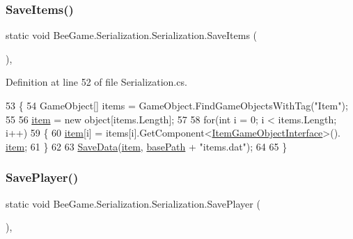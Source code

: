 \subsubsection{\texorpdfstring{Save\+Items()}{SaveItems()}}
{\footnotesize\ttfamily static void Bee\+Game.\+Serialization.\+Serialization.\+Save\+Items (\begin{DoxyParamCaption}{ }\end{DoxyParamCaption})\hspace{0.3cm}{\ttfamily [static]}, {\ttfamily [private]}}



Definition at line 52 of file Serialization.\+cs.


\begin{DoxyCode}
53         \{
54             GameObject[] items = GameObject.FindGameObjectsWithTag(\textcolor{stringliteral}{"Item"});
55 
56             \hyperlink{class_bee_game_1_1_serialization_1_1_serialization_af3359d6ca7e84c9e52a790beb1cc502e}{item} = \textcolor{keyword}{new} \textcolor{keywordtype}{object}[items.Length];
57 
58             \textcolor{keywordflow}{for}(\textcolor{keywordtype}{int} i = 0; i < items.Length; i++)
59             \{
60                 \hyperlink{class_bee_game_1_1_serialization_1_1_serialization_af3359d6ca7e84c9e52a790beb1cc502e}{item}[i] = items[i].GetComponent<\hyperlink{class_bee_game_1_1_items_1_1_item_game_object_interface}{ItemGameObjectInterface}>().
      \hyperlink{class_bee_game_1_1_serialization_1_1_serialization_af3359d6ca7e84c9e52a790beb1cc502e}{item};
61             \}
62 
63             \hyperlink{class_bee_game_1_1_serialization_1_1_serialization_a5e84293340234b478d4ef6bd8168260f}{SaveData}(\hyperlink{class_bee_game_1_1_serialization_1_1_serialization_af3359d6ca7e84c9e52a790beb1cc502e}{item}, \hyperlink{class_bee_game_1_1_serialization_1_1_serialization_ab90922fcf58a723ce591487507356310}{basePath} + \textcolor{stringliteral}{"items.dat"});
64             
65         \}
\end{DoxyCode}
\mbox{\label{class_bee_game_1_1_serialization_1_1_serialization_a86c4e702114f2f6fdf2dd55517d8e691}} 
\subsubsection{\texorpdfstring{Save\+Player()}{SavePlayer()}}
{\footnotesize\ttfamily static void Bee\+Game.\+Serialization.\+Serialization.\+Save\+Player (\begin{DoxyParamCaption}{ }\end{DoxyParamCaption})\hspace{0.3cm}{\ttfamily [static]}, {\ttfamily [private]}}



